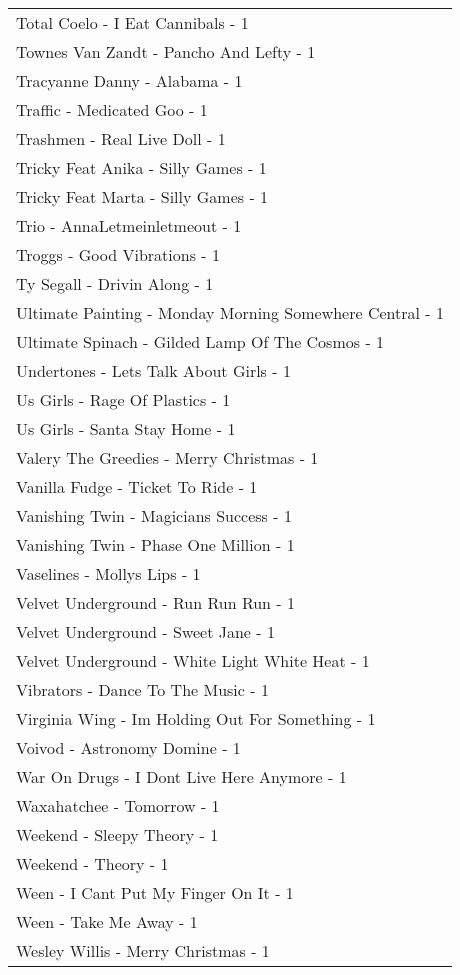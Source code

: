 \documentclass[
]{article}
\begin{document}
\begin{longtable}{l}
Total Coelo - I Eat Cannibals - 1 \\ 
Townes Van Zandt - Pancho And Lefty - 1 \\ 
Tracyanne Danny - Alabama - 1 \\ 
Traffic - Medicated Goo - 1 \\ 
Trashmen - Real Live Doll - 1 \\ 
Tricky Feat Anika - Silly Games - 1 \\ 
Tricky Feat Marta - Silly Games - 1 \\ 
Trio - AnnaLetmeinletmeout - 1 \\ 
Troggs - Good Vibrations - 1 \\ 
Ty Segall - Drivin Along - 1 \\ 
Ultimate Painting - Monday Morning Somewhere Central - 1 \\ 
Ultimate Spinach - Gilded Lamp Of The Cosmos - 1 \\ 
Undertones - Lets Talk About Girls - 1 \\ 
Us Girls - Rage Of Plastics - 1 \\ 
Us Girls - Santa Stay Home - 1 \\ 
Valery The Greedies - Merry Christmas - 1 \\ 
Vanilla Fudge - Ticket To Ride - 1 \\ 
Vanishing Twin - Magicians Success - 1 \\ 
Vanishing Twin - Phase One Million - 1 \\ 
Vaselines - Mollys Lips - 1 \\ 
Velvet Underground - Run Run Run - 1 \\ 
Velvet Underground - Sweet Jane - 1 \\ 
Velvet Underground - White Light White Heat - 1 \\ 
Vibrators - Dance To The Music - 1 \\ 
Virginia Wing - Im Holding Out For Something - 1 \\ 
Voivod - Astronomy Domine - 1 \\ 
War On Drugs - I Dont Live Here Anymore - 1 \\ 
Waxahatchee - Tomorrow - 1 \\ 
Weekend - Sleepy Theory - 1 \\ 
Weekend - Theory - 1 \\ 
Ween - I Cant Put My Finger On It - 1 \\ 
Ween - Take Me Away - 1 \\ 
Wesley Willis - Merry Christmas - 1 \\ 

\end{longtable}
\end{document}
